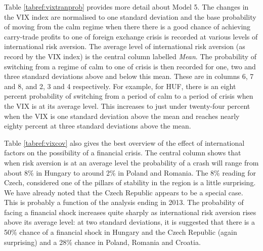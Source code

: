 \documentclass[12pt, a4paper, oneside]{article}\usepackage[]{graphicx}\usepackage[]{color}
\begin{document}
Table \ref{tabref:vixtranprob} provides more detail about Model 5.  The changes in the VIX index are normalised to one standard deviation and the base probability of moving from the calm regime when there there is a good chance of achieving carry-trade profits to one of foreign exchange crisis is recorded at various levels of international risk aversion.  The average level of international risk aversion (as record by the VIX index) is the central column labelled \emph{Mean}.  The probability of switching from a regime of calm to one of crisis is then recorded for one, two and three standard deviations above and below this mean.  These are in columns 6, 7 and 8, and 2, 3 and 4 respectively.  For example, for HUF, there is an eight percent  probability of switching from a period of calm to a period of crisis when the VIX is at its average level. This increases to just under twenty-four percent when the VIX is one standard deviation above the mean and reaches nearly eighty percent at three standard deviations above the mean. 

Table \ref{tabref:vixcov} also gives the best overview of the effect of international factors on the possibility of a financial crisis.  The central column shows that when risk aversion is at an average level the probability of a crash will range from about 8\% in Hungary to around 2\% in Poland and Romania.  The 8\% reading for Czech, considered one of the pillars of stability in the region is a little surprising. We have already noted that the Czech Republic appears to be a special case. This is probably a function of the analysis ending in 2013.  The probability of facing a financial shock increases quite sharply as international risk aversion rises above its average level: at two standard deviations, it is suggested that there is a 50\% chance of a financial shock in Hungary and the Czech Republic (again surprising) and a 28\% chance in Poland, Romania and Croatia. 
\end{document}
